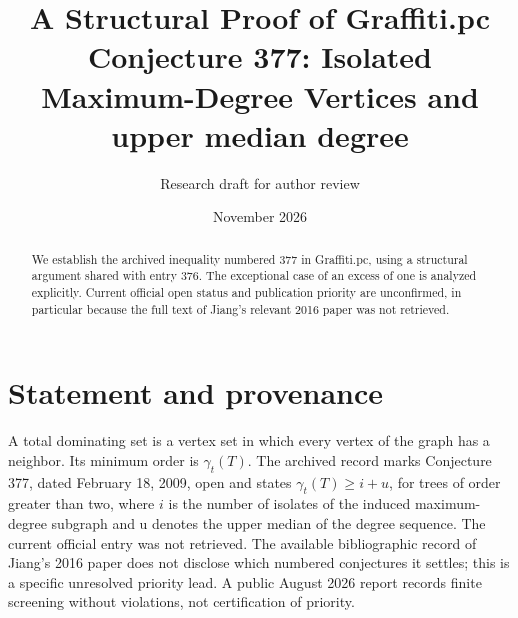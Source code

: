 \documentclass[11pt]{article}
\title{A Structural Proof of Graffiti.pc Conjecture 377: Isolated Maximum-Degree Vertices and upper median degree}
\author{Research draft for author review}
\date{November 2026}
\begin{document}
\maketitle
\begin{abstract}
We establish the archived inequality numbered 377 in Graffiti.pc, using a structural argument shared with entry 376. The exceptional case of an excess of one is analyzed explicitly. Current official open status and publication priority are unconfirmed, in particular because the full text of Jiang's relevant 2016 paper was not retrieved.
\end{abstract}
\section{Statement and provenance}
A total dominating set is a vertex set in which every vertex of the graph has a neighbor. Its minimum order is $\gamma_t(T)$. The archived record \cite{archive} marks Conjecture 377, dated February 18, 2009, open and states $\gamma_t(T)\ge i+u$, for trees of order greater than two, where $i$ is the number of isolates of the induced maximum-degree subgraph and u denotes the upper median of the degree sequence. The current official entry \cite{wow} was not retrieved. The available bibliographic record of Jiang's 2016 paper \cite{jiang} does not disclose which numbered conjectures it settles; this is a specific unresolved priority lead. A public August 2026 report \cite{screen} records finite screening without violations, not certification of priority.
\end{document}
